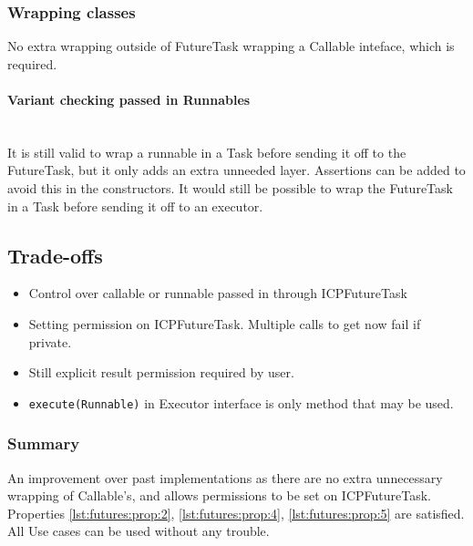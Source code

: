 \subsubsection*{Wrapping classes}

No extra wrapping outside of FutureTask wrapping a Callable inteface, which is required.

\paragraph*{Variant checking passed in Runnables} ~\\
It is still valid to wrap a runnable in a Task before sending it off to the FutureTask, but it only adds an
extra unneeded layer. Assertions can be added to avoid this in the constructors. It would still be possible
to wrap the FutureTask in a Task before sending it off to an executor.

\subsection*{Trade-offs}
\begin{itemize}
    \item Control over callable or runnable passed in through ICPFutureTask
    \item Setting permission on ICPFutureTask. Multiple calls to get now fail if private.
    \item Still explicit result permission required by user.
    \item \lstinline{execute(Runnable)} in Executor interface is only method that may be used.
\end{itemize}

\subsubsection*{Summary}
An improvement over past implementations as there are no extra unnecessary wrapping of Callable's, and allows
permissions to be set on ICPFutureTask. Properties \ref{lst:futures:prop:2}, \ref{lst:futures:prop:4},
\ref{lst:futures:prop:5} are satisfied. All Use cases can be used without any trouble.

